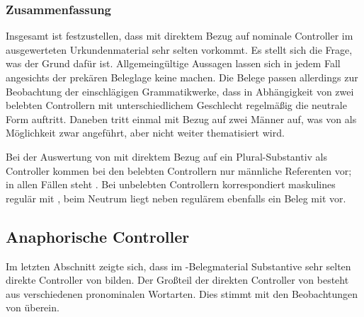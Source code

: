 \begin{exe}
\end{exe}

\subsubsection{Zusammenfassung}

Insgesamt ist festzustellen, dass  mit direktem Bezug auf nominale
Controller im ausgewerteten Urkundenmaterial sehr selten vorkommt. Es stellt
sich die Frage, was der Grund dafür ist. Allgemeingültige Aussagen lassen sich
in jedem Fall angesichts der prekären Beleglage keine machen. Die Belege passen
allerdings zur Beobachtung der einschlägigen Grammatikwerke, dass in
Abhängigkeit von zwei belebten Controllern mit unterschiedlichem
Geschlecht regelmäßig die neutrale Form  auftritt. Daneben tritt
 einmal mit Bezug auf zwei Männer auf, was von
\citet[384]{paul2007} als Möglichkeit zwar angeführt, aber nicht weiter
thematisiert wird.

Bei der Auswertung von  mit direktem Bezug auf ein
Plural-Substantiv als Controller kommen bei den belebten
Controllern nur männliche Referenten vor; in allen Fällen steht .
Bei unbelebten Controllern korrespondiert maskulines 
regulär mit , beim Neutrum liegt neben regulärem 
ebenfalls ein Beleg mit  vor.

\subsection{Anaphorische Controller}
\label{subsec:refctrl}

Im letzten Abschnitt zeigte sich, dass im \CAO{}-Belegmaterial
Substantive sehr selten direkte Controller von  bilden. Der
Großteil der direkten Controller von  besteht aus verschiedenen
pronominalen Wortarten.
Dies stimmt mit den Beobachtungen von \citet[624--625]{ksw2} überein.

